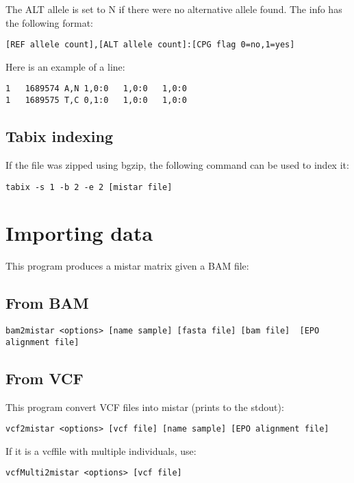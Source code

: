 \documentclass[a4paper]{article}
\begin{document}
\noindent  The ALT allele is set to N if there were no alternative allele found. The info has the following format:

\begin{verbatim}
[REF allele count],[ALT allele count]:[CPG flag 0=no,1=yes]
\end{verbatim}

\noindent  Here is an example of a line:

\begin{verbatim}
1	1689574	A,N	1,0:0	1,0:0	1,0:0
1	1689575	T,C	0,1:0	1,0:0	1,0:0
\end{verbatim}


\subsection{Tabix indexing}

\noindent If the file was zipped using bgzip, the following command can be used to index it:
\begin{verbatim}
tabix -s 1 -b 2 -e 2 [mistar file]
\end{verbatim}

\section{Importing data}

This program produces a  mistar matrix given a BAM file:

\subsection{From BAM}

\small
\begin{verbatim} 
bam2mistar <options> [name sample] [fasta file] [bam file]  [EPO alignment file]
\end{verbatim} 
\normalsize

\subsection{From VCF}

This program convert VCF files into mistar (prints to the stdout):

\begin{verbatim}
vcf2mistar <options> [vcf file] [name sample] [EPO alignment file]
\end{verbatim}

If it is a vcffile with multiple individuals, use:
\begin{verbatim}
vcfMulti2mistar <options> [vcf file]
\end{verbatim}
\end{document}
